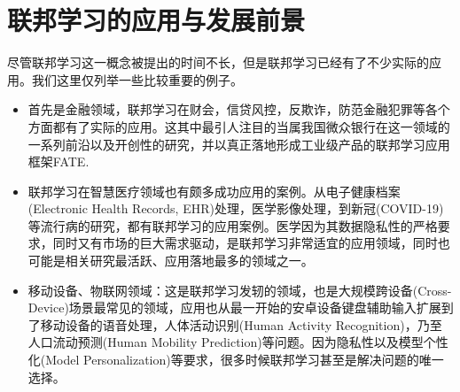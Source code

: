 \section{联邦学习的应用与发展前景}
\label{sec:chap1-fl-applications}

尽管联邦学习这一概念被提出\cite{mcmahan2017fed_avg}的时间不长，但是联邦学习已经有了不少实际的应用。我们这里仅列举一些比较重要的例子。
\begin{itemize}
    \item 首先是金融领域，联邦学习在财会\cite{Schreyer_2022_fl_audits}，信贷风控\cite{Imteaj_2022_fl}，反欺诈\cite{Lv_2021_fl}，防范金融犯罪\cite{Toyotaro_2019_fl}等各个方面都有了实际的应用。这其中最引人注目的当属我国微众银行在这一领域的一系列前沿以及开创性的研究\cite{Yang_2019_VFL, liu_2020_transfer_fl, vfl}，并以真正落地形成工业级产品的联邦学习应用框架FATE\cite{liu_2021_fate_fl}.
    \item 联邦学习在智慧医疗领域也有颇多成功应用的案例\cite{rauniyar2022_fl_medical, Antunes_2022_fl_healthcare}。从电子健康档案(Electronic Health Records, EHR)处理\cite{Brisimi_2018_fl_ehr}，医学影像处理\cite{Li_2020_fl_mri}，到新冠(COVID-19)等流行病的研究\cite{Dayan_2021_fl_covid}，都有联邦学习的应用案例。医学因为其数据隐私性的严格要求，同时又有市场的巨大需求驱动，是联邦学习非常适宜的应用领域，同时也可能是相关研究最活跃、应用落地最多的领域之一。
    \item 移动设备、物联网领域：这是联邦学习发轫\cite{mcmahan2017fed_avg}的领域，也是大规模跨设备(Cross-Device)场景最常见的领域，应用也从最一开始的安卓设备键盘辅助输入扩展到了移动设备的语音处理\cite{Leroy_2019_fl_ks}，人体活动识别(Human Activity Recognition)\cite{Sozinov_2018_fl_human}，乃至人口流动预测(Human Mobility Prediction)\cite{feng_2020_fl_pmf}等问题。因为隐私性以及模型个性化(Model Personalization)等要求，很多时候联邦学习甚至是解决问题的唯一选择。
\end{itemize}

